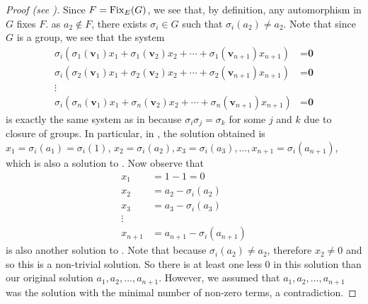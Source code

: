 \begin{proof}[Proof (see {\cite[Theorem 14]{artin_1971}})]
    Since $F = \mathrm{Fix}_{E}(G)$, we see that, by definition, any automorphism in $G$ fixes $F$. as $a_2 \notin F$, there exists $\sigma_i \in G$ such that $\sigma_i(a_2) \neq a_2$. Note that since $G$ is a group, we see that the system
    \begin{equation}\label{eqn:thrm-subgroup-of-automorphisms-equals-galois-group-if-base-field-is-fixed-field-A-prime}
        \begin{split}
            \sigma_i\left(\sigma_1(\textbf{v}_1)x_1 + \sigma_1(\textbf{v}_2)x_2 + \cdots + \sigma_1(\textbf{v}_{n+1})x_{n+1}\right) &= \textbf{0}\\
            \sigma_i\left(\sigma_2(\textbf{v}_1)x_1 + \sigma_2(\textbf{v}_2)x_2 + \cdots + \sigma_2(\textbf{v}_{n+1})x_{n+1}\right) &= \textbf{0}\\
            \vdots\\
            \sigma_i\left(\sigma_n(\textbf{v}_1)x_1 + \sigma_n(\textbf{v}_2)x_2 + \cdots + \sigma_n(\textbf{v}_{n+1})x_{n+1}\right) &= \textbf{0}
        \end{split}
        \tag{A'}
    \end{equation}
    is exactly the same system as in  because $\sigma_i\sigma_j = \sigma_k$ for some $j$ and $k$ due to closure of groups. In particular, in , the solution obtained is $x_1 = \sigma_i(a_1) = \sigma_i(1)$, $x_2 = \sigma_i(a_2), x_3 = \sigma_i(a_3), \dots, x_{n+1} = \sigma_i(a_{n+1})$, which is also a solution to . Now observe that
    \begin{align*}
        x_1 &= 1 - 1 = 0\\
        x_2 &= a_2 - \sigma_i(a_2)\\
        x_3 &= a_3 - \sigma_i(a_3)\\
        \vdots\\
        x_{n+1} &= a_{n+1} - \sigma_i(a_{n+1})
    \end{align*}
    is also another solution to . Note that because $\sigma_i(a_2) \neq a_2$, therefore $x_2 \neq 0$ and so this is a non-trivial solution. So there is at least one less 0 in this solution than our original solution $a_1, a_2, \dots, a_{n+1}$. However, we assumed that $a_1, a_2, \dots, a_{n+1}$ was the solution with the minimal number of non-zero terms, a contradiction.


\end{proof}
